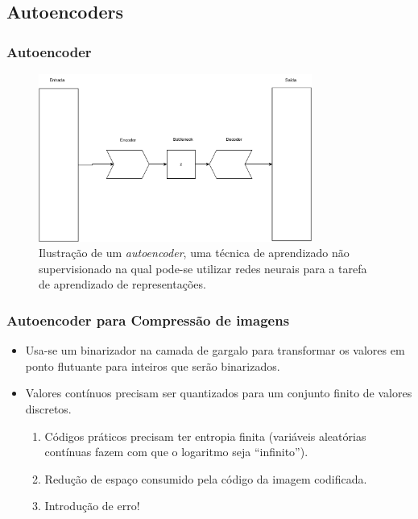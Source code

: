 \documentclass{beamer}
\begin{document}
\subsection{Autoencoders}
\begin{frame}
\frametitle{Autoencoder}
\begin{figure}
\includegraphics[width=0.8\textwidth]{figs/autoencoder.pdf}
\caption{Ilustração de um \textit{autoencoder}, uma técnica de aprendizado não supervisionado na qual pode-se utilizar redes neurais para a tarefa de aprendizado de representações.}
\end{figure}
\end{frame}
\begin{frame}
\frametitle{Autoencoder para Compressão de imagens}
\begin{itemize}
\item Usa-se um binarizador na camada de gargalo para transformar os valores em ponto flutuante para inteiros que serão binarizados.
\item Valores contínuos precisam ser quantizados para um conjunto finito de valores discretos.
\begin{enumerate}
\item Códigos práticos precisam ter entropia finita (variáveis aleatórias contínuas fazem com que o logaritmo seja ``infinito'').
\item Redução de espaço consumido pela código da imagem codificada.
\item Introdução de erro!
\end{enumerate}
\end{itemize}
\end{frame}
\end{document}
